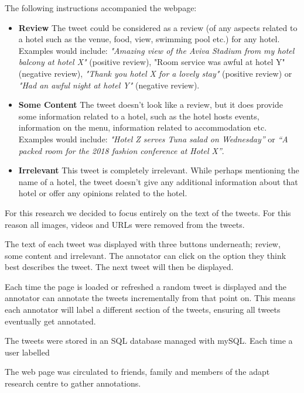 The following instructions accompanied the webpage:
\begin{itemize}
    \item \textbf{Review} \newline
    The tweet could be considered as a review (of any aspects related to a hotel such as the venue, food, view, swimming pool etc.) for any hotel. Examples would include: \emph{"Amazing view of the Aviva Stadium from my hotel balcony at hotel X"} (positive review), "Room service was awful at hotel Y" (negative review), \emph{"Thank you hotel X for a lovely stay"} (positive review) or \emph{"Had an awful night at hotel Y"} (negative review).
    \item \textbf{Some Content} \newline
    The tweet doesn't look like a review, but it does provide some information related to a hotel, such as the hotel hosts events, information on the menu, information related to accommodation etc. Examples would include: \emph{"Hotel Z serves Tuna salad on Wednesday”} or \emph{“A packed room for the 2018 fashion conference at Hotel X”}.
    \item \textbf{Irrelevant} \newline
    This tweet is completely irrelevant. While perhaps mentioning the name of a hotel, the tweet doesn't give any additional information about that hotel or offer any opinions related to the hotel.
\end{itemize}

For this research we decided to focus entirely on the text of the tweets. For this reason all images, videos and URLs were removed from the tweets.

The text of each tweet was displayed with three buttons underneath; review, some content and irrelevant. The annotator can click on the option they think best describes the tweet. The next tweet will then be displayed. 

Each time the page is loaded or refreshed a random tweet is displayed and the annotator can annotate the tweets incrementally from that point on. This means each annotator will label a different section of the tweets, ensuring all tweets eventually get annotated.

The tweets were stored in an SQL database managed with mySQL. Each time a user labelled 

The web page was circulated to friends, family and members of the adapt research centre to gather annotations. 

